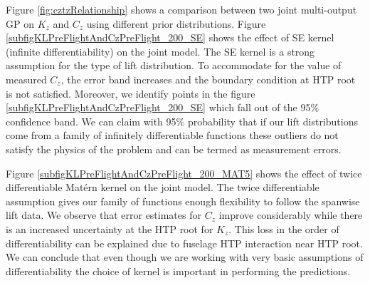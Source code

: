 Figure \ref{fig:cztzRelationship} shows a comparison between two joint multi-output GP on \(K_{z}\) and \(C_{z}\) using different prior distributions. Figure \ref{subfigKLPreFlightAndCzPreFlight_200_SE} shows the effect of SE kernel (infinite differentiability) on the joint model. The SE kernel is a strong assumption for the type of lift distribution. To accommodate for the value of measured \(C_{z}\), the error band increases and the boundary condition at HTP root is not satisfied. Moreover, we identify points in the figure \ref{subfigKLPreFlightAndCzPreFlight_200_SE} which fall out of the 95\% confidence band. We can claim with 95\% probability that if our lift distributions come from a family of infinitely differentiable functions these outliers do not satisfy the physics of the problem and can be termed as measurement errors.

Figure \ref{subfigKLPreFlightAndCzPreFlight_200_MAT5} shows the effect of twice differentiable Mat\'ern kernel on the joint model. The twice differentiable assumption gives our family of functions enough flexibility to follow the spanwise lift data. We observe that error estimates for \(C_{z}\) improve considerably while there is an increased uncertainty at the HTP root for \(K_{z}\). This loss in the order of differentiability can be explained due to fuselage HTP interaction near HTP root. We can conclude that even though we are working with very basic assumptions of differentiability the choice of kernel is important in performing the predictions. 

